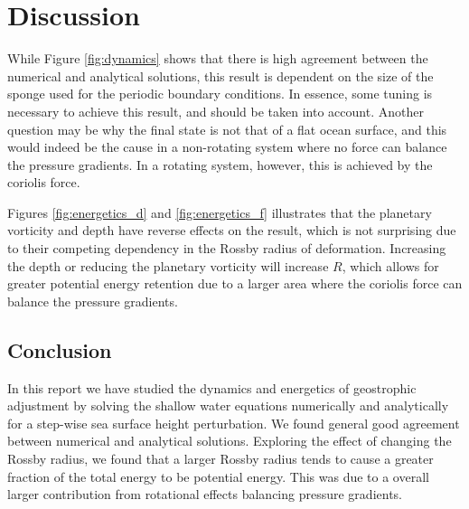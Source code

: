 \section{Discussion}
\label{sec:conclusion}

While Figure \ref{fig:dynamics} shows that there is high agreement between the numerical and analytical solutions, this result is dependent on the size of the sponge used for the periodic boundary conditions. In essence, some tuning is necessary to achieve this result, and should be taken into account. Another question may be why the final state is not that of a flat ocean surface, and this would indeed be the cause in a non-rotating system where no force can balance the pressure gradients. In a rotating system, however, this is achieved by the coriolis force.

Figures \ref{fig:energetics_d} and \ref{fig:energetics_f} illustrates that the planetary vorticity and depth have reverse effects on the result, which is not surprising due to their competing dependency in the Rossby radius of deformation. Increasing the depth or reducing the planetary vorticity will increase $R$, which allows for greater potential energy retention due to a larger area where the coriolis force can balance the pressure gradients.

\subsection{Conclusion}
In this report we have studied the dynamics and energetics of geostrophic adjustment by solving the shallow water equations numerically and analytically for a step-wise sea surface height perturbation. We found general good agreement between numerical and analytical solutions. Exploring the effect of changing the Rossby radius, we found that a larger Rossby radius tends to cause a greater fraction of the total energy to be potential energy. This was due to a overall larger contribution from rotational effects balancing pressure gradients.